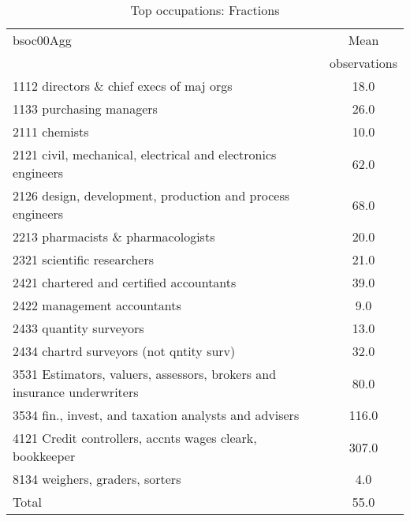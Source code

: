 \begin{table}
	\centering
	\caption{Top occupations: Fractions}
	\begin{tabular}{lc}
	\toprule	
		
bsoc00Agg&Mean \\
&observations \\
\hline
1112 directors \& chief execs of maj orgs&18.0 \\
1133 purchasing managers&26.0 \\
2111 chemists&10.0 \\
2121 civil, mechanical, electrical and electronics engineers&62.0 \\
2126 design, development, production and process engineers&68.0 \\
2213 pharmacists \& pharmacologists&20.0 \\
2321 scientific researchers&21.0 \\
2421 chartered and certified accountants&39.0 \\
2422 management accountants&9.0 \\
2433 quantity surveyors&13.0 \\
2434 chartrd surveyors (not qntity surv)&32.0 \\
3531 Estimators, valuers, assessors, brokers and insurance underwriters&80.0 \\
3534 fin., invest, and taxation analysts and advisers&116.0 \\
4121 Credit controllers, accnts wages cleark, bookkeeper&307.0 \\
8134 weighers, graders, sorters&4.0 \\
Total&55.0 \\
\bottomrule
\bottomrule
\end{tabular}
\end{table}
